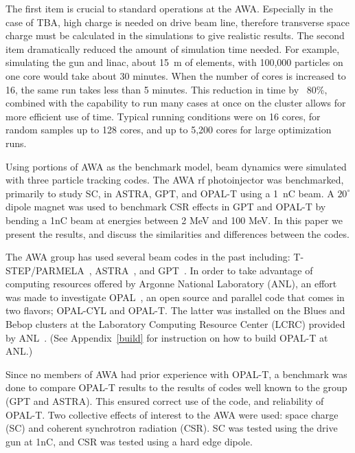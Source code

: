 The first item is crucial to standard operations at the AWA. Especially in the 
case of TBA, high charge is needed on drive beam line, therefore transverse 
space charge must be calculated in the simulations to give realistic results.
The second item dramatically reduced the amount of simulation time needed. 
For example, simulating the gun and linac, about \SI{15}{m} of elements,
with 100,000 particles on one core would take about 30 minutes. 
When the number of cores is increased to 16, the same run takes less than 
5 minutes. This reduction in time by ~80\%, combined with the capability to run 
many cases at once on the cluster allows for more efficient use of time.
Typical running conditions were on 16 cores, for random samples up to 128 cores, 
and up to 5,200 cores for large optimization runs.  

Using portions of AWA as the benchmark model,  
beam dynamics were simulated with three particle tracking codes.
The AWA rf photoinjector was benchmarked, primarily to study SC, 
in ASTRA, GPT, and OPAL-T using a \SI{1}{nC} beam. 
A $20^{\circ}$ dipole magnet was used to benchmark 
CSR effects in GPT and OPAL-T by bending a 1nC beam 
at  energies  between  2  MeV  and  100  MeV.  In  this  paper  
we  present  the  results,  and  discuss  the  similarities  and  
differences between the codes.
 
The AWA group has used several beam codes in the past including:
T-STEP/PARMELA~\cite{parmela}, ASTRA~\cite{astra}, and GPT~\cite{gpt}.  
In order to take advantage of computing resources offered by 
Argonne National Laboratory (ANL), an effort was made to investigate
OPAL~\cite{opal}, an open source and parallel code that comes in two flavors;  
OPAL-CYL and OPAL-T. The latter was installed on the Blues and Bebop clusters
at the Laboratory Computing Resource Center (LCRC) provided by ANL~\cite{lcrc}.
(See Appendix~\ref{build} for instruction on how to build OPAL-T at ANL.)

Since no members of AWA had prior experience with OPAL-T, a benchmark 
was done to compare \mbox{OPAL-T} results to the results of codes 
well known to the group (GPT and ASTRA). 
This ensured correct use of the code, and reliability of \mbox{OPAL-T}.
Two collective effects of interest to the AWA were used: 
space charge (SC) and coherent synchrotron radiation (CSR).
SC was tested using the drive gun at 1nC, and CSR was tested
using a hard edge dipole.


